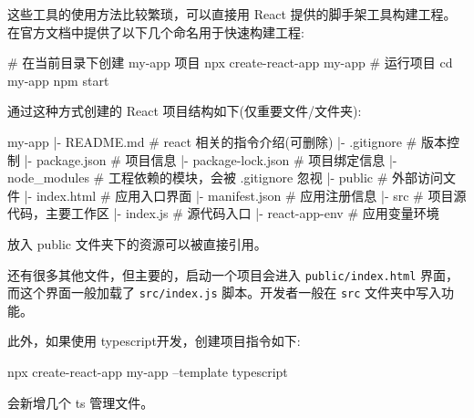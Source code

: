 这些工具的使用方法比较繁琐，可以直接用 React 提供的脚手架工具构建工程。在官方文档中提供了以下几个命名用于快速构建工程:

\begin{bash}
# 在当前目录下创建 my-app 项目
npx create-react-app my-app
# 运行项目
cd my-app
npm start
\end{bash}

通过这种方式创建的 React 项目结构如下(仅重要文件/文件夹):

\begin{bash}
my-app
|- README.md            # react 相关的指令介绍(可删除)
|- .gitignore           # 版本控制
|- package.json         # 项目信息
|- package-lock.json    # 项目绑定信息
|- node_modules         # 工程依赖的模块，会被 .gitignore 忽视
|- public               # 外部访问文件
    |- index.html       # 应用入口界面
    |- manifest.json    # 应用注册信息
|- src              # 项目源代码，主要工作区
    |- index.js     # 源代码入口
    |- react-app-env    # 应用变量环境
\end{bash}

放入 public 文件夹下的资源可以被直接引用。

还有很多其他文件，但主要的，启动一个项目会进入 \texttt{public/index.html} 界面，而这个界面一般加载了 \texttt{src/index.js} 脚本。开发者一般在 \texttt{src} 文件夹中写入功能。

此外，如果使用 typescript开发，创建项目指令如下:

\begin{bash}
npx create-react-app my-app --template typescript
\end{bash}

会新增几个 ts 管理文件。

\newpage